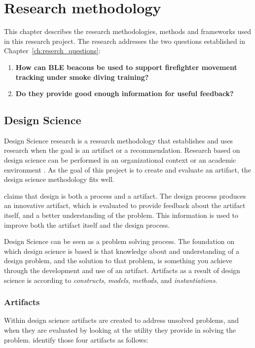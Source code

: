 \documentclass[../Main/thesis.tex]{subfiles}
\begin{document}
\chapter{Research methodology}
\label{ch:research_methodology}
This chapter describes the research methodologies, methods and frameworks used in this research project.
The research addresses the two questions established in Chapter~\ref{ch:reserch_questions}:

\begin{enumerate}
	\item \textbf{How can BLE beacons be used to support firefighter movement tracking under smoke diving training?}
	\item \textbf{Do they provide good enough information for useful feedback?}
\end{enumerate}

\section{Design Science}
Design Science research is a research methodology that establishes and uses research when the goal is an artifact or a recommendation.
Research based on design science can be performed in an organizational context or an academic environment \citep{lacerda2015design}.
As the goal of this project is to create and evaluate an artifact, the design science methodology fits well.

\citet{hevner2004design} claims that design is both a process and a artifact.
The design process produces an innovative artifact, which is evaluated to provide feedback about the artifact itself, and a better understanding of the problem. 
This information is used to improve both the artifact itself and the design process.

Design Science can be seen as a problem solving process.
The foundation on which design science is based is that knowledge about and understanding of a design problem, and the solution to that problem, is something you achieve through the development and use of an artifact.
Artifacts as a result of design science is according to \citet{March1995} \textit{constructs}, \textit{models}, \textit{methods}, and \textit{instantiations}.


\subsection{Artifacts}
Within design science artifacts are created to address unsolved problems, and when they are evaluated by looking at the utility they provide in solving the problem.
\citet[p.78-79]{hevner2004design} identify those four artifacts as follows:
\end{document}
